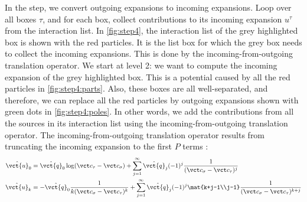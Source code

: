 \begin{enumerate}
  In the  step, we convert outgoing expansions to incoming expansions.
  Loop over all boxes $\tau$, and for each box, collect contributions to its incoming expansion $u^\tau$ from the interaction list.
  In \cref{fig:step4}, the interaction list of the grey highlighted box is shown with the red particles.
  It is the list box for which the grey box needs to collect the incoming expansions.
  This is done by the incoming-from-outgoing translation operator.
  We start at level 2: we want to compute the incoming expansion of the grey highlighted box.
  This is a potential caused by all the red particles in \cref{fig:step4:parts}.
  Also, these boxes are all well-separated, and therefore, we can replace all the red particles by outgoing expansions shown with green dots in \cref{fig:step4:poles}.
  In other words, we add the contributions from all the sources in its interaction list using the incoming-from-outgoing translation operator.
  The incoming-from-outgoing translation operator results from truncating the incoming expansion to the first $P$ terms \cite{Martinsson2015}:
    \begin{equation}
      \begin{split}
        \hat{\vct{u}}_0 &= \hat{\vct{q}}_0 \log(\vct c_\tau - \vct c_\sigma) + \sum_{j=1}^\infty \hat{\vct{q}}_j (-1)^j \frac 1 {(\vct c_\sigma - \vct c_\tau)^j} \\
        \hat{\vct{u}}_k &= -\hat{\vct{q}}_0 \frac 1 {k(\vct c_\sigma - \vct c_\tau)^k} + \sum_{j=1}^\infty \hat{\vct{q}}_j (-1)^j \mat{k+j-1\\j-1} \frac 1 {(\vct c_\sigma - \vct c_\tau)^{k+j}} \\
      \end{split}
    \end{equation}


  \begin{figure}
    \centering
\end{figure}
\end{enumerate}
